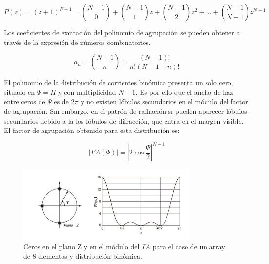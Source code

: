 \begin{equation}
	P(z)=(z+1)^{N-1}=\binom{N-1}{0}+\binom{N-1}{1}z+\binom{N-1}{2}z^{2}+...+\binom{N-1}{N-1}z^{N-1}
	\label{eq:newton}
\end{equation}

\par Los coeficientes de excitación del polinomio de agrupación se pueden obtener a través de la expresión de números combinatorios. 

\begin{equation}
	a_{n}=\binom{N-1}{n}=\frac{\left ( N-1 \right )!}{n!\left ( N-1-n \right )!}
	\label{eq:combinatorios}
\end{equation}

\par El polinomio de la distribución de corrientes binómica presenta un solo cero, situado en $\Psi=\Pi$ y con multiplicidad $N-1$. Es por ello que el ancho de haz entre ceros de $\Psi$ es de $2\pi$ y no existen lóbulos secundarios en el módulo del factor de agrupación. Sin embargo, en el patrón de radiación si pueden aparecer lóbulos secundarios debido a la los lóbulos de difracción, que entra en el margen visible. El factor de agrupación obtenido para esta distribución es: 

\begin{equation}
	\left | FA (\Psi) \right |=\left | 2\cos\frac{\Psi}{2} \right |^{N-1}	
	\label{eq:Fabinom}
\end{equation}

\begin{figure}[h]
    \centering
        \includegraphics[width=0.8\textwidth]{archivos/array/triangular}
        \caption{Ceros en el plano Z y en el módulo del \textit{FA} para el caso de un array de 8 elementos y distribución binómica. \citep{Cardama2002}}
        \label{fig:cerosbinom}
\end{figure}


